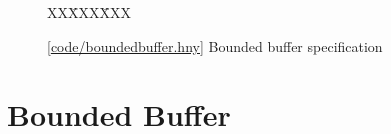 \documentclass{report}
\newcommand{\harmonysource}[1]{
\begin{tabbing}
XX\=XXX\=XXX\kill
    
\end{tabbing}
}
\newcommand{\harmonylink}[1]{%
[\href{https://harmony.cs.cornell.edu/#1}{\underline{#1}}]%
}
\newenvironment{code}{
\tcolorbox
}{
\endtcolorbox
}
\begin{document}

\begin{figure}
\begin{code}
\harmonysource{boundedbuffer}
\end{code}
\caption{\harmonylink{code/boundedbuffer.hny} Bounded buffer specification}
\label{fig:boundedbuffer}
\end{figure}

\section{Bounded Buffer}
%
%
%
\end{document}
